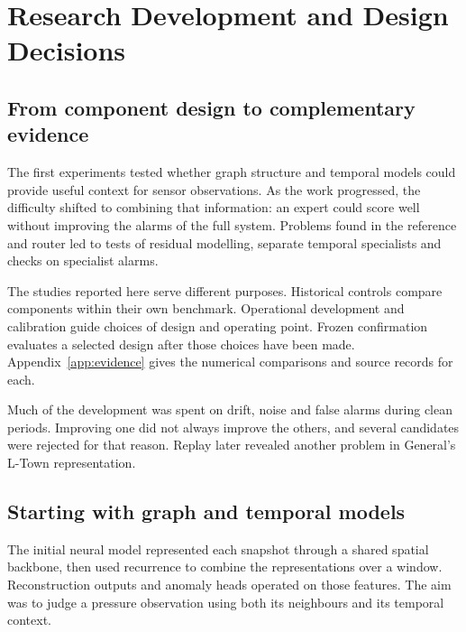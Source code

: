 \chapter{Research Development and Design Decisions}
\label{ch:development}

\section{From component design to complementary evidence}
The first experiments tested whether graph structure and temporal models could provide useful context for sensor observations. As the work progressed, the difficulty shifted to combining that information: an expert could score well without improving the alarms of the full system. Problems found in the reference and router led to tests of residual modelling, separate temporal specialists and checks on specialist alarms.

The studies reported here serve different purposes. Historical controls compare components within their own benchmark. Operational development and calibration guide choices of design and operating point. Frozen confirmation evaluates a selected design after those choices have been made. Appendix~\ref{app:evidence} gives the numerical comparisons and source records for each.

Much of the development was spent on drift, noise and false alarms during clean periods. Improving one did not always improve the others, and several candidates were rejected for that reason. Replay later revealed another problem in General's L-Town representation.


\section{Starting with graph and temporal models}
The initial neural model represented each snapshot through a shared spatial backbone, then used recurrence to combine the representations over a window. Reconstruction outputs and anomaly heads operated on those features. The aim was to judge a pressure observation using both its neighbours and its temporal context.

